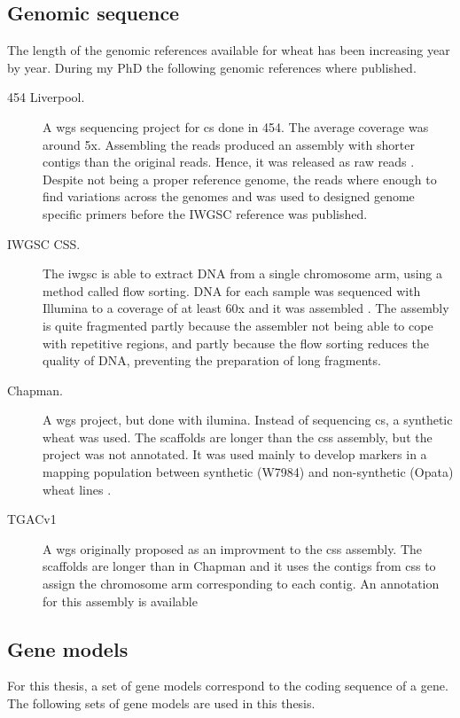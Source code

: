 \subsection{Genomic sequence}

The length of the genomic references available for wheat has been increasing year by year. During my PhD the following genomic references where published.   

\begin{description}
\item[454 Liverpool.] A \gls{wgs} sequencing project for \gls{cs} done in 454. The average coverage was around 5x. Assembling the reads produced an assembly with shorter contigs than the original reads. Hence, it was released as raw reads \citep{Brenchley2012}. Despite not being a proper reference genome, the reads where enough to find variations across the genomes and was used to designed genome specific primers before the IWGSC reference was published. 
\item[IWGSC CSS.] The \gls{iwgsc} is able to extract DNA from a single chromosome arm, using a method called flow sorting. DNA for each sample was sequenced with Illumina to a coverage of at least 60x and it was assembled \citep{Mayer2014}. The assembly is quite fragmented partly because the assembler not being able to cope with repetitive regions, and partly because the flow sorting reduces the quality of DNA, preventing the preparation of long fragments. 
\item[Chapman.] A \gls{wgs} project, but done with ilumina. Instead of sequencing \gls{cs}, a synthetic wheat was used. The scaffolds are longer than the \gls{css} assembly, but the project was not annotated. It was used mainly to develop markers in a mapping population between synthetic (W7984) and non-synthetic (Opata) wheat lines \citep{Chapman2015}.   
\item[TGACv1] A \gls{wgs} originally proposed as an improvment to the \gls{css} assembly. The scaffolds are longer than in Chapman and it uses the contigs from \gls{css} to assign the chromosome arm corresponding to each contig. An annotation for this assembly is available \citep{Clark2016}
\end{description}


\subsection{Gene models}

For this thesis, a set of gene models correspond to the coding sequence of a gene. 
The following sets of gene models are used in this thesis. 

